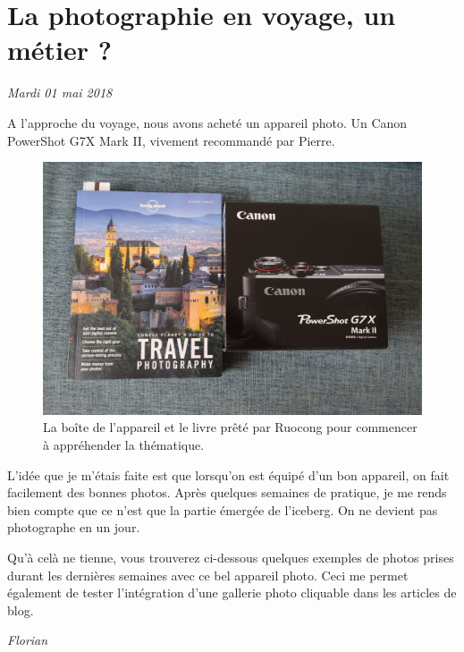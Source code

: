 \hypertarget{la-photographie-en-voyage-un-muxe9tier}{%
\section{La photographie en voyage, un métier
?}\label{la-photographie-en-voyage-un-muxe9tier}}

\emph{Mardi 01 mai 2018}

A l'approche du voyage, nous avons acheté un appareil photo. Un Canon
PowerShot G7X Mark II, vivement recommandé par Pierre.

\begin{figure}
\centering
\includegraphics{images/appareil_photo_canon_g7x.JPG}
\caption{La boîte de l'appareil et le livre prêté par Ruocong pour
commencer à appréhender la thématique.}
\end{figure}

L'idée que je m'étais faite est que lorsqu'on est équipé d'un bon
appareil, on fait facilement des bonnes photos. Après quelques semaines
de pratique, je me rends bien compte que ce n'est que la partie émergée
de l'iceberg. On ne devient pas photographe en un jour.

Qu'à celà ne tienne, vous trouverez ci-dessous quelques exemples de
photos prises durant les dernières semaines avec ce bel appareil photo.
Ceci me permet également de tester l'intégration d'une gallerie photo
cliquable dans les articles de blog.

\emph{Florian}


